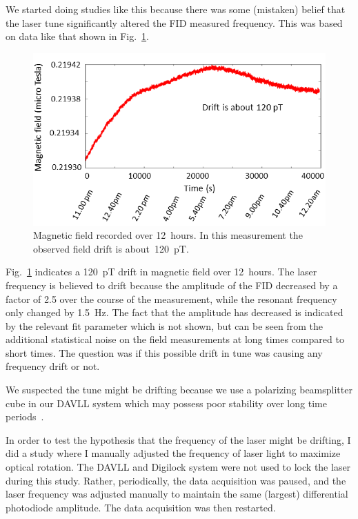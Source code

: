 We started doing studies like this because there was some (mistaken)
belief that the laser tune significantly altered the FID measured
frequency.  This was based on data like that shown in
Fig.~\ref{fig:digilock-drift}.

\begin{figure}%
  \centering\includegraphics[width=0.8\linewidth]{figures/field-drift}
  \caption{Magnetic field recorded over 12~hours.  In this
    measurement the observed field drift is
    about~120~pT.\label{fig:digilock-drift}}
\end{figure}

Fig.~\ref{fig:digilock-drift} indicates a 120~pT drift in magnetic
field over 12~hours.  The laser frequency is believed to drift because
the amplitude of the FID decreased by a factor of 2.5 over the course
of the measurement, while the resonant frequency only changed by
1.5~Hz.  The fact that the amplitude has decreased is indicated by the
relevant fit parameter which is not shown, but can be seen from the
additional statistical noise on the field measurements at long times
compared to short times.  The question was if this possible drift in
tune was causing any frequency drift or not.

We suspected the tune might be drifting because we use a polarizing
beamsplitter cube in our DAVLL system which may possess poor stability
over long time periods~\cite{bib:Philip2008}.

In order to test the hypothesis that the frequency of the laser might
be drifting, I did a study where I manually adjusted the frequency of
laser light to maximize optical rotation.  The DAVLL and Digilock
system were not used to lock the laser during this study.  Rather,
periodically, the data acquisition was paused, and the laser frequency
was adjusted manually to maintain the same (largest) differential
photodiode amplitude. The data acquisition was then restarted.

